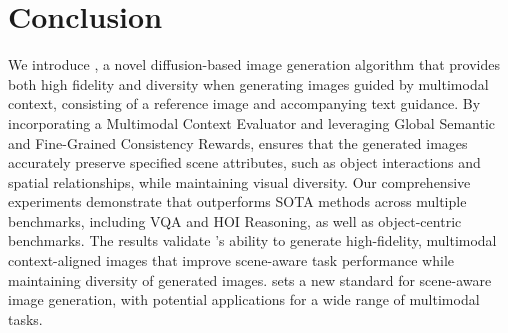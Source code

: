 \section{Conclusion}
We introduce \method, a novel diffusion-based image generation algorithm that provides both high fidelity and diversity when generating images guided by multimodal context, consisting of a reference image and accompanying text guidance. By incorporating a Multimodal Context Evaluator and leveraging Global Semantic and Fine-Grained Consistency Rewards, \method ensures that the generated images accurately preserve specified scene attributes, such as object interactions and spatial relationships, while maintaining visual diversity. Our comprehensive experiments demonstrate that \method outperforms SOTA methods across multiple benchmarks, including VQA and HOI Reasoning, as well as object-centric benchmarks. The results validate \method's ability to generate high-fidelity, multimodal context-aligned images that improve scene-aware task performance while maintaining diversity of generated images. \method sets a new standard for scene-aware image generation, with potential applications for a wide range of multimodal tasks.

